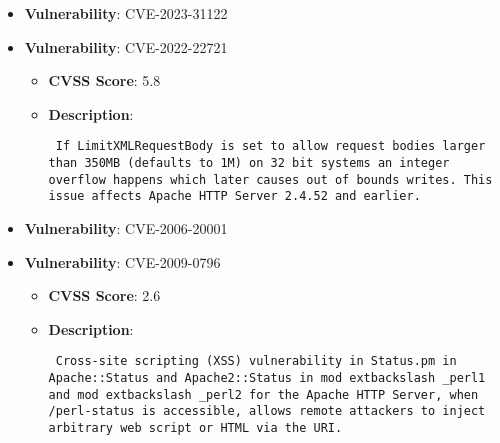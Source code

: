 \documentclass{article}
\begin{document}
\begin{itemize}
        \item \textbf{Vulnerability}: CVE-2023-31122
    
        \item \textbf{Vulnerability}: CVE-2022-22721
        \begin{itemize}
            \item \textbf{CVSS Score}:  5.8 
            \item \textbf{Description}: \parbox{\linewidth}{\texttt{ If LimitXMLRequestBody is set to allow request bodies larger than 350MB (defaults to 1M) on 32 bit systems an integer overflow happens which later causes out of bounds writes. This issue affects Apache HTTP Server 2.4.52 and earlier. }}
        \end{itemize}
    
        \item \textbf{Vulnerability}: CVE-2006-20001
    
        \item \textbf{Vulnerability}: CVE-2009-0796
        \begin{itemize}
            \item \textbf{CVSS Score}:  2.6 
            \item \textbf{Description}: \parbox{\linewidth}{\texttt{ Cross-site scripting (XSS) vulnerability in Status.pm in Apache::Status and Apache2::Status in mod	extbackslash _perl1 and mod	extbackslash _perl2 for the Apache HTTP Server, when /perl-status is accessible, allows remote attackers to inject arbitrary web script or HTML via the URI. }}
        \end{itemize}
    

\end{itemize}
\end{document}
